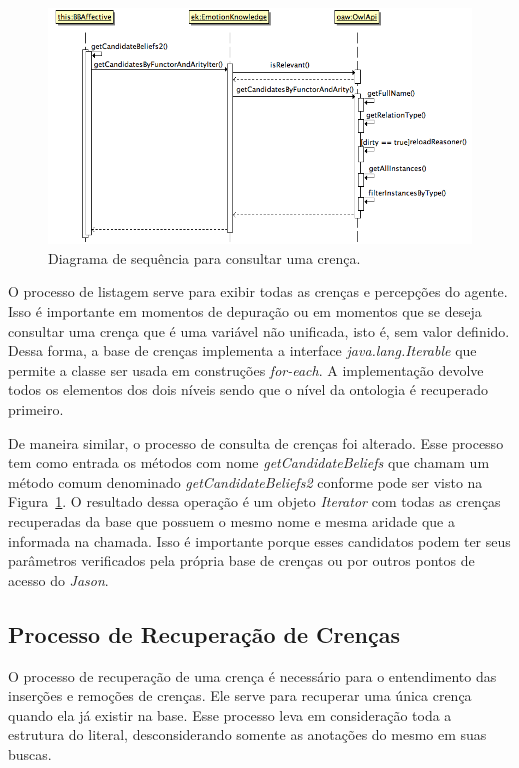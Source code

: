 \begin{figure}
  \centering
  \includegraphics[width=12cm]{figuras/sd-getCB.png}
  \caption{Diagrama de sequência para consultar uma crença.}
  \label{fig:getCandidates}
\end{figure}

O processo de listagem serve para exibir todas as crenças e percepções do
agente. Isso é importante em momentos de depuração ou em momentos que se
deseja consultar uma crença que é uma variável não unificada, isto é, sem
valor definido. Dessa forma, a base de crenças implementa a interface
\emph{java.lang.Iterable} que permite a classe ser usada em construções
\emph{for-each}. A implementação devolve todos os elementos dos dois níveis
sendo que o nível da ontologia é recuperado primeiro.

De maneira similar, o processo de consulta de crenças foi alterado.
Esse processo tem como entrada os métodos com nome \emph{getCandidateBeliefs}
que chamam um método comum denominado \emph{getCandidateBeliefs2} conforme
pode ser visto na Figura~\ref{fig:getCandidates}. O resultado dessa operação é
um objeto \emph{Iterator} com todas as crenças recuperadas da base que possuem
o mesmo nome e mesma aridade que a informada na chamada. Isso é importante
porque esses candidatos podem ter seus parâmetros verificados pela própria
base de crenças ou por outros pontos de acesso do \emph{Jason}.

\subsection{Processo de Recuperação de Crenças}

O processo de recuperação de uma crença é necessário para o entendimento das
inserções e remoções de crenças. Ele serve para recuperar uma única crença
quando ela já existir na base. Esse processo leva em consideração toda a
estrutura do literal, desconsiderando somente as anotações do mesmo em suas
buscas.

